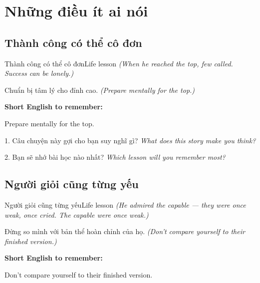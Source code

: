 \chapter{Những điều ít ai nói}


\section{Thành công có thể cô đơn}
\begin{truyen}{Thành công có thể cô đơn}{Life lesson}
\textit{(When he reached the top, few called. Success can be lonely.)}
\end{truyen}

\begin{baihoc}
Chuẩn bị tâm lý cho đỉnh cao.
\textit{(Prepare mentally for the top.)}
\end{baihoc}

\begin{ghinhoanh}
\textbf{Short English to remember:}

Prepare mentally for the top.

\end{ghinhoanh}

\begin{tuhocnhanh}
1. Câu chuyện này gợi cho bạn suy nghĩ gì? \textit{What does this story make you think?}

2. Bạn sẽ nhớ bài học nào nhất? \textit{Which lesson will you remember most?}
\end{tuhocnhanh}
\ngancach


\section{Người giỏi cũng từng yếu}
\begin{truyen}{Người giỏi cũng từng yếu}{Life lesson}
\textit{(He admired the capable — they were once weak, once cried. The capable were once weak.)}
\end{truyen}

\begin{baihoc}
Đừng so mình với bản thể hoàn chỉnh của họ.
\textit{(Don't compare yourself to their finished version.)}
\end{baihoc}

\begin{ghinhoanh}
\textbf{Short English to remember:}

Don't compare yourself to their finished version.

\end{ghinhoanh}

